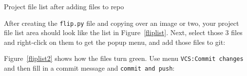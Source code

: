 \documentclass[titlepage]{tufte-book}
\newcommand{\figref}[1]{Figure~\ref{#1}}
\begin{document}
\begin{marginfigure}
\begin{center}
\end{center}
\caption{Project file list after adding files to repo}
\label{fliplist2}
\end{marginfigure}


After creating the {\tt flip.py} file and copying over an image or two, your project file list area should look like the list in \figref{fliplist}. Next, select those 3 files and right-click on them to get the popup menu, and add those files to git:


\noindent \figref{fliplist2} shows how the files turn green. Use menu {\tt VCS:Commit changes} and then fill in a commit message and {\tt commit and push}:

\end{document}
